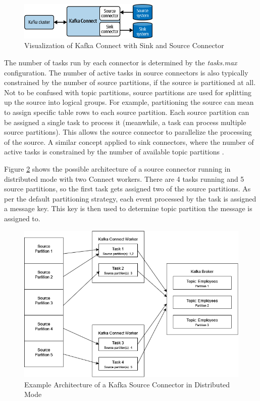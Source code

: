 \begin{figure}[htbp]
 \centering
 \includegraphics[width=0.6\textwidth]{chapters/images/kafkaconnectexample.png}
 \caption{Visualization of Kafka Connect with Sink and Source Connector \cite{maison2023kafkaconnect}}
 \label{fig:fundamentals:kafkaconnectexample}
\end{figure}

The number of tasks run by each connector is determined by the \textit{tasks.max} configuration. The number of active tasks in source connectors is also typically constrained by the number of source partitions, if the source is partitioned at all. Not to be confused with topic partitions, source partitions are used for splitting up the source into logical groups. For example, partitioning the source can mean to assign specific table rows to each source partition. Each source partition can be assigned a single task to process it (meanwhile, a task can process multiple source partitions). This allows the source connector to parallelize the processing of the source. A similar concept applied to sink connectors, where the number of active tasks is constrained by the number of available topic partitions \cite{maison2023kafkaconnect}.

Figure \ref{fig:fundamentals:kafkaconnectarchitecture} shows the possible architecture of a source connector running in distributed mode with two Connect workers. There are 4 tasks running and 5 source partitions, so the first task gets assigned two of the source partitions. As per the default partitioning strategy, each event processed by the task is assigned a message key. This key is then used to determine topic partition the message is assigned to.

\begin{figure}[htbp]
 \centering
 \includegraphics[width=1\textwidth]{chapters/images/kafka connect architecture.drawio.png}
 \caption{Example Architecture of a Kafka Source Connector in Distributed Mode}
 \label{fig:fundamentals:kafkaconnectarchitecture}
\end{figure}

